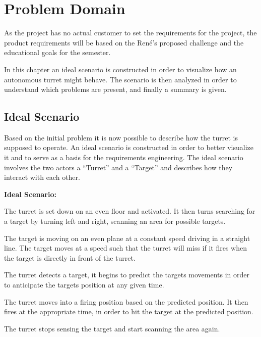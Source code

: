 \chapter{Problem Domain}
As the project has no actual customer to set the requirements for the project,
the product requirements will be based on the Ren\'e's proposed challenge and
the educational goals for the semester.\nl

In this chapter an ideal scenario is constructed in order to visualize how an
autonomous turret might behave. The scenario is then analyzed in order to
understand which problems are present, and finally a summary is given.



%
%
%
%
%
%
%
%


\section{Ideal Scenario}
Based on the initial problem it is now possible to describe how the turret is
supposed to operate. An ideal scenario is constructed in order to better
visualize it and to serve as a basis for the requirements engineering. The
ideal scenario involves the two actors a ``Turret'' and a ``Target'' and
describes how they interact with each other.

\begin{center}
\colorbox{diff}{
\begin{minipage}{0.8\linewidth}
\textbf{Ideal Scenario:}

The turret is set down on an even floor and activated. It then turns searching
for a target by turning left and right, scanning an area for possible
targets.\nl

The target is moving on an even plane at a constant speed driving in a straight
line. The target moves at a speed such that the turret will miss if it fires
when the target is directly in front of the turret.\nl

The turret detects a target, it begins to predict the targets movements in
order to anticipate the targets position at any given time.\nl

The turret moves into a firing position based on the predicted position. It then
fires at the appropriate time, in order to hit the target at the predicted
position.\nl

The turret stops sensing the target and start scanning the area again.

\end{minipage}
}
\end{center}


